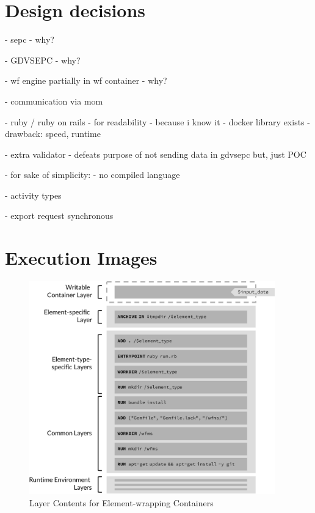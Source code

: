 
\section{Design decisions} %
\label{sec:design_decisions}

  - sepc
    - why?

  - GDVSEPC
    - why?

  - wf engine partially in wf container
    - why?

  - communication via mom

  - ruby / ruby on rails
    - for readability
    - because i know it
    - docker library exists
    - drawback: speed, runtime

  - extra validator
    - defeats purpose of not sending data in gdvsepc but, just POC

  - for sake of simplicity:
    - no compiled language

  - activity types

  - export request synchronous

\section{Execution Images} %
\label{sec:execution_images}
  \begin{figure}[htbp]
    \centering
    \includegraphics[width=0.95\textwidth]{content/images/execution_container-crop.pdf}
    \caption{Layer Contents for Element-wrapping Containers}
    \label{fig:detailed_layers_for_element_wrapping_containers}
  \end{figure}

